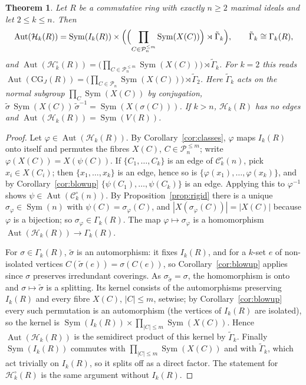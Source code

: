 \documentclass{amsart}
\newtheorem{theorem}{Theorem}[section]
\theoremstyle{definition}
\theoremstyle{remark}
\newcommand{\Aut}{\operatorname{Aut}}
\newcommand{\Sym}{\operatorname{Sym}}
\newcommand{\CG}{\mathrm{CG}_J}
\newcommand{\cC}{\mathcal{C}}
\newcommand{\cP}{\mathcal{P}}
\newcommand{\cH}{\mathcal{H}}
\begin{document}
\begin{theorem}\label{thm:aut}
Let $R$ be a commutative ring with exactly $n\ge2$ maximal ideals and let $2\le k\le n$. Then
\[
\Aut(\cH_k(R))=\Sym(I_k(R))\times\Bigl(\Bigl(\prod_{C\in\cP_n^{\le m}}\Sym(X(C))\Bigr)\rtimes\tilde\Gamma_k\Bigr),\qquad \tilde\Gamma_k\cong\Gamma_k(R),
\]
and $\Aut(\cH_k^\circ(R))=\bigl(\prod_{C\in\cP_n^{\le m}}\Sym(X(C))\bigr)\rtimes\tilde\Gamma_k$. For $k=2$ this reads $\Aut(\CG(R))=\bigl(\prod_{C\in\cP_n}\Sym(X(C))\bigr)\rtimes\tilde\Gamma_2$. Here $\tilde\Gamma_k$ acts on the normal subgroup $\prod_{C}\Sym(X(C))$ by conjugation, $\tilde\sigma\,\Sym(X(C))\,\tilde\sigma^{-1}=\Sym(X(\sigma(C)))$. If $k>n$, $\cH_k(R)$ has no edges and $\Aut(\cH_k(R))=\Sym(V(R))$.
\end{theorem}

\begin{proof}
Let $\varphi\in\Aut(\cH_k(R))$. By Corollary~\ref{cor:classes}, $\varphi$ maps $I_k(R)$ onto itself and permutes the fibres $X(C)$, $C\in\cP_n^{\le m}$; write $\varphi(X(C))=X(\psi(C))$. If $\{C_1,\dots,C_k\}$ is an edge of $\cC_k^\circ(n)$, pick $x_i\in X(C_i)$; then $\{x_1,\dots,x_k\}$ is an edge, hence so is $\{\varphi(x_1),\dots,\varphi(x_k)\}$, and by Corollary~\ref{cor:blowup} $\{\psi(C_1),\dots,\psi(C_k)\}$ is an edge. Applying this to $\varphi^{-1}$ shows $\psi\in\Aut(\cC_k^\circ(n))$. By Proposition~\ref{prop:rigid} there is a unique $\sigma_\varphi\in\Sym(n)$ with $\psi(C)=\sigma_\varphi(C)$, and $|X(\sigma_\varphi(C))|=|X(C)|$ because $\varphi$ is a bijection; so $\sigma_\varphi\in\Gamma_k(R)$. The map $\varphi\mapsto\sigma_\varphi$ is a homomorphism $\Aut(\cH_k(R))\to\Gamma_k(R)$.

For $\sigma\in\Gamma_k(R)$, $\tilde\sigma$ is an automorphism: it fixes $I_k(R)$, and for a $k$-set $e$ of non-isolated vertices $C(\tilde\sigma(e))=\sigma(C(e))$, so Corollary~\ref{cor:blowup} applies since $\sigma$ preserves irredundant coverings. As $\sigma_{\tilde\sigma}=\sigma$, the homomorphism is onto and $\sigma\mapsto\tilde\sigma$ is a splitting. Its kernel consists of the automorphisms preserving $I_k(R)$ and every fibre $X(C)$, $|C|\le m$, setwise; by Corollary~\ref{cor:blowup} every such permutation is an automorphism (the vertices of $I_k(R)$ are isolated), so the kernel is $\Sym(I_k(R))\times\prod_{|C|\le m}\Sym(X(C))$. Hence $\Aut(\cH_k(R))$ is the semidirect product of this kernel by $\tilde\Gamma_k$. Finally $\Sym(I_k(R))$ commutes with $\prod_{|C|\le m}\Sym(X(C))$ and with $\tilde\Gamma_k$, which act trivially on $I_k(R)$, so it splits off as a direct factor. The statement for $\cH_k^\circ(R)$ is the same argument without $I_k(R)$.
\end{proof}
\end{document}
